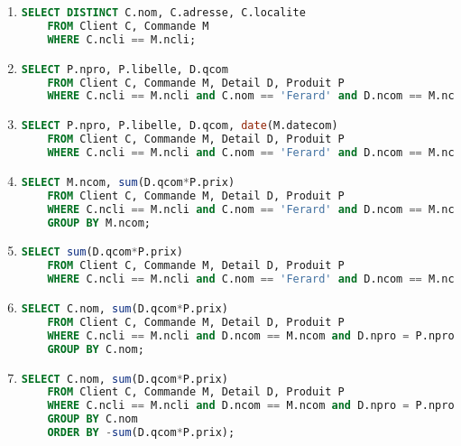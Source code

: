 \documentclass{article}
\begin{document}
\begin{enumerate}
    \item
    \begin{lstlisting}[language=SQL]
    SELECT DISTINCT C.nom, C.adresse, C.localite
    FROM Client C, Commande M
    WHERE C.ncli == M.ncli; \end{lstlisting}

    \item
    \begin{lstlisting}[language=SQL]
    SELECT P.npro, P.libelle, D.qcom
    FROM Client C, Commande M, Detail D, Produit P
    WHERE C.ncli == M.ncli and C.nom == 'Ferard' and D.ncom == M.ncom and D.npro = P.npro; \end{lstlisting}

    \item
    \begin{lstlisting}[language=SQL]
    SELECT P.npro, P.libelle, D.qcom, date(M.datecom)
    FROM Client C, Commande M, Detail D, Produit P
    WHERE C.ncli == M.ncli and C.nom == 'Ferard' and D.ncom == M.ncom and D.npro = P.npro; \end{lstlisting}

    \item
    \begin{lstlisting}[language=SQL]
    SELECT M.ncom, sum(D.qcom*P.prix)
    FROM Client C, Commande M, Detail D, Produit P
    WHERE C.ncli == M.ncli and C.nom == 'Ferard' and D.ncom == M.ncom and D.npro = P.npro
    GROUP BY M.ncom; \end{lstlisting}

    \item
    \begin{lstlisting}[language=SQL]
    SELECT sum(D.qcom*P.prix)
    FROM Client C, Commande M, Detail D, Produit P
    WHERE C.ncli == M.ncli and C.nom == 'Ferard' and D.ncom == M.ncom and D.npro = P.npro; \end{lstlisting}

    \item
    \begin{lstlisting}[language=SQL]
    SELECT C.nom, sum(D.qcom*P.prix)
    FROM Client C, Commande M, Detail D, Produit P
    WHERE C.ncli == M.ncli and D.ncom == M.ncom and D.npro = P.npro
    GROUP BY C.nom; \end{lstlisting}

    \item
    \begin{lstlisting}[language=SQL]
    SELECT C.nom, sum(D.qcom*P.prix)
    FROM Client C, Commande M, Detail D, Produit P
    WHERE C.ncli == M.ncli and D.ncom == M.ncom and D.npro = P.npro
    GROUP BY C.nom
    ORDER BY -sum(D.qcom*P.prix); \end{lstlisting}
\end{enumerate}
\end{document}
